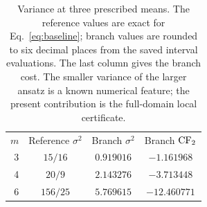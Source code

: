 \begin{table}[t]
\caption{Variance at three prescribed means. The reference values are exact for Eq.~\eqref{eq:baseline}; branch values are rounded to six decimal places from the saved interval evaluations. The last column gives the branch cost. The smaller variance of the larger ansatz is a known numerical feature; the present contribution is the full-domain local certificate.}
\label{tab:values}
\begin{ruledtabular}
\begin{tabular}{rccc}
$m$ & Reference $\sigma^2$ & Branch $\sigma^2$ & Branch $\mathrm{CF}_2$\\
3 & $15/16$ & $0.919016$ & $-1.161968$\\
4 & $20/9$ & $2.143276$ & $-3.713448$\\
6 & $156/25$ & $5.769615$ & $-12.460771$\\
\end{tabular}
\end{ruledtabular}
\end{table}
